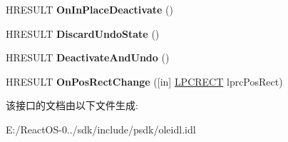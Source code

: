 \begin{DoxyCompactItemize}
H\+R\+E\+S\+U\+LT {\bfseries On\+In\+Place\+Deactivate} ()
\item 
\mbox{\label{interface_i_ole_in_place_site_a46759c78e9be85ed9abd1adf67558089}} 
H\+R\+E\+S\+U\+LT {\bfseries Discard\+Undo\+State} ()
\item 
\mbox{\label{interface_i_ole_in_place_site_a4f93f19bc784462d54c82221a0d73e2f}} 
H\+R\+E\+S\+U\+LT {\bfseries Deactivate\+And\+Undo} ()
\item 
\mbox{\label{interface_i_ole_in_place_site_a3a1f39e61c18ebbb158d8135d39a0430}} 
H\+R\+E\+S\+U\+LT {\bfseries On\+Pos\+Rect\+Change} (\mbox{[}in\mbox{]} \hyperlink{structtag_r_e_c_t}{L\+P\+C\+R\+E\+CT} lprc\+Pos\+Rect)
\end{DoxyCompactItemize}


该接口的文档由以下文件生成\+:\begin{DoxyCompactItemize}
\item 
E\+:/\+React\+O\+S-\/0../sdk/include/psdk/oleidl.\+idl\end{DoxyCompactItemize}
